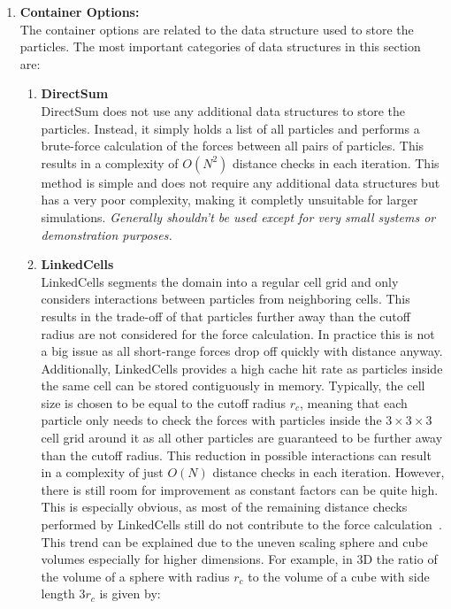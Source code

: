 \begin{enumerate}[label=\textbf{\arabic*.}]
      \item \textbf{Container Options:} \\
            The container options are related to the data structure used to store the particles. The most important categories of data structures in this section are:
            \begin{enumerate}
                  \item \textbf{DirectSum} \\
                        DirectSum does not use any additional data structures to store the particles. Instead, it simply holds a list of all particles and performs a brute-force calculation of the forces between all pairs of particles. This results in a complexity of $O(N^2)$ distance checks in each iteration. This method is simple and does not require any additional data structures but has a very poor complexity, making it completly unsuitable for larger simulations. \textit{Generally shouldn't be used except for very small systems or demonstration purposes.~\cite{VICCIONE2008625}}
                  \item \textbf{LinkedCells} \\
                        LinkedCells segments the domain into a regular cell grid and only considers interactions between particles from neighboring cells. This results in the trade-off of that particles further away than the cutoff radius are not considered for the force calculation. In practice this is not a big issue as all short-range forces drop off quickly with distance anyway. Additionally, LinkedCells provides a high cache hit rate as particles inside the same cell can be stored contiguously in memory. Typically, the cell size is chosen to be equal to the cutoff radius $r_c$, meaning that each particle only needs to check the forces with particles inside the $3\times3\times3$ cell grid around it as all other particles are guaranteed to be further away than the cutoff radius. This reduction in possible interactions can result in a complexity of just $O(N)$ distance checks in each iteration. However, there is still room for improvement as constant factors can be quite high. This is especially obvious, as most of the remaining distance checks performed by LinkedCells still do not contribute to the force calculation~\cite{GRATL2019748}. This trend can be explained due to the uneven scaling sphere and cube volumes especially for higher dimensions. For example, in 3D the ratio of the volume of a sphere with radius $r_c$ to the volume of a cube with side length $3r_c$ is given by:


\end{enumerate}
\end{enumerate}
